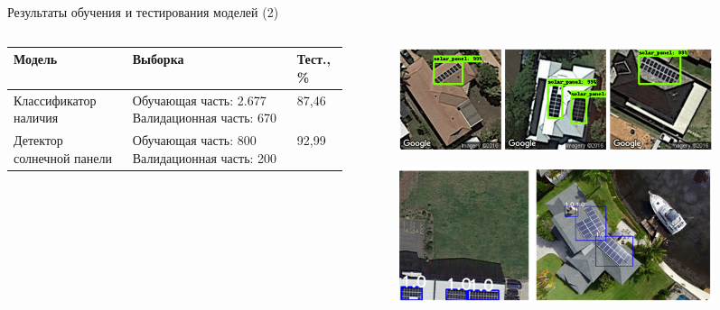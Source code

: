 \documentclass[10pt]{beamer}
\begin{document}
        \begin{frame}{Результаты обучения и тестирования моделей (2)}
            \begin{columns}
                \begin{column}{0.55\textwidth}
                \begin{table}
                    \centering
                    \begin{tabular}{| p{2.3cm} | p{2.3cm} | p{1cm} | }
                        \hline
                        \textbf{Модель} & 
                        \textbf{Выборка} & \textbf{Тест., \%}\\
                        \hline
                        Классификатор наличия & Обучающая часть: 2.677\newline
                        Валидационная часть: 
                        670 & 87,46\\
                        \hline
                        Детектор солнечной панели & Обучающая часть:
                        800\newline
                        Валидационная часть:
                        200 & 92,99\\
                        \hline
                    \end{tabular}
                \end{table} 
                \end{column}
                \begin{column}{0.45\textwidth}
                    \begin{figure}
                        \centering
                        \includegraphics[width=0.9\textwidth]{pic4-22.png}
                    \end{figure}
                    \begin{figure}
                        \centering
                        \includegraphics[width=0.9\textwidth]{pic4-23.png}
                    \end{figure}
                \end{column}
            \end{columns}
        \end{frame}
\end{document}
